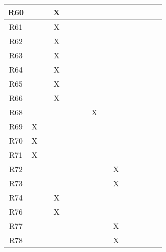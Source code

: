\begin{table}[]
\begin{tabular}{|c|c|c|c|c|c|c|c|c|c|c|c|c|c|c|}
R60 &    &    & X  &    &    &    &    &    &    &     &     &     &     &     \\ \hline
R61 &    &    & X  &    &    &    &    &    &    &     &     &     &     &     \\ \hline
R62 &    &    & X  &    &    &    &    &    &    &     &     &     &     &     \\ \hline
R63 &    &    & X  &    &    &    &    &    &    &     &     &     &     &     \\ \hline
R64 &    &    & X  &    &    &    &    &    &    &     &     &     &     &     \\ \hline
R65 &    &    & X  &    &    &    &    &    &    &     &     &     &     &     \\ \hline
R66 &    &    & X  &    &    &    &    &    &    &     &     &     &     &     \\ \hline
R68 &    &    &    &    &    &    & X  &    &    &     &     &     &     &     \\ \hline
R69 & X  &    &    &    &    &    &    &    &    &     &     &     &     &     \\ \hline
R70 & X  &    &    &    &    &    &    &    &    &     &     &     &     &     \\ \hline
R71 & X  &    &    &    &    &    &    &    &    &     &     &     &     &     \\ \hline
R72 &    &    &    &    &    &    &    &    & X  &     &     &     &     &     \\ \hline
R73 &    &    &    &    &    &    &    &    & X  &     &     &     &     &     \\ \hline
R74 &    &    & X  &    &    &    &    &    &    &     &     &     &     &     \\ \hline
R76 &    &    & X  &    &    &    &    &    &    &     &     &     &     &     \\ \hline
R77 &    &    &    &    &    &    &    &    & X  &     &     &     &     &     \\ \hline
R78 &    &    &    &    &    &    &    &    & X  &     &     &     &     &     \\ \hline
\end{tabular}
\end{table}